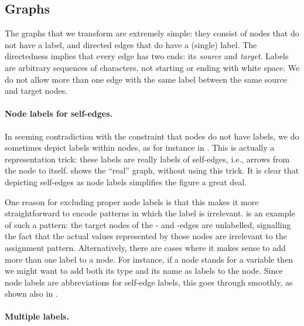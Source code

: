 \subsection{Graphs}

The graphs that we transform are extremely simple: they consist of nodes that
do not have a label, and directed edges that do have a (single) label. The
directedness implies that every edge has two ends: its \emph{source} and
\emph{target}. Labels are arbitrary sequences of characters, not starting or
ending with white space. We do not allow more than one edge with the same label between
the same source and target nodes.

\paragraph{Node labels for self-edges.}

In seeming contradiction with the constraint that nodes do not have labels, we
do sometimes depict labels within nodes, as for instance in
.  This is actually a representation trick: these labels
are really labels of self-edges, i.e., arrows from the node to itself.
 shows the ``real'' graph, without using this trick.  It is
clear that depicting self-edges as node labels simplifies the figure a great
deal.
%

One reason for excluding proper node labels is that this makes it more
straightforward to encode patterns in which the label is irrelevant.
 is an example of such a pattern: the target nodes of the
\xx- and \yy-edges are unlabelled, signalling the fact that the actual values
represented by those nodes are irrelevant to the assignment
pattern. Alternatively, there are cases where it makes sense to add more than one label
to a node. For instance, if a node stands for a variable then we might want to
add both its type and its name as labels to the node. Since node labels are
abbreviations for self-edge labels, this goes through smoothly, as shown also
in .

\paragraph{Multiple labels.}


